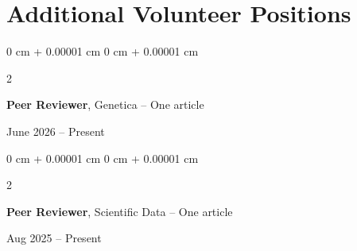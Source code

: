 \documentclass[10pt, letterpaper]{article}
\newenvironment{onecolentry}{
    \begin{adjustwidth}{
        0 cm + 0.00001 cm
    }{
        0 cm + 0.00001 cm
    }
}{
    \end{adjustwidth}
} %
\newenvironment{twocolentry}[2][]{
    \onecolentry
    \def\secondColumn{#2}
    \setcolumnwidth{\fill, 4.5 cm}
    \begin{paracol}{2}
}{
    \switchcolumn \raggedleft \secondColumn
    \end{paracol}
    \endonecolentry
} %
\begin{document}
%
%            
%




%
%
%
%




    \section{Additional Volunteer Positions}





        \begin{samepage} 
            \begin{twocolentry}{
                June 2026 – Present
                }
                \textbf{Peer Reviewer}, Genetica -- One article
            \end{twocolentry}
        \end{samepage} 


        \vspace{0.2 cm} 

        
        \begin{samepage} 
            \begin{twocolentry}{
                Aug 2025 – Present
                }
                \textbf{Peer Reviewer}, Scientific Data -- One article
            \end{twocolentry}
        \end{samepage} 
\end{document}
